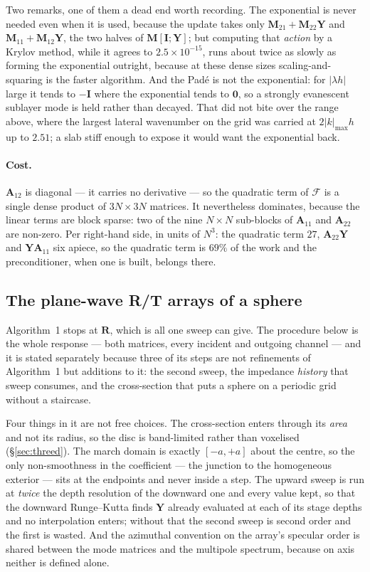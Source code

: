 \documentclass[11pt,a4paper]{article}
\newcommand{\bI}{\mathbf{I}}
\newcommand{\bA}{\mathbf{A}}
\newcommand{\bR}{\mathbf{R}}
\newcommand{\bY}{\mathbf{Y}}
\begin{document}
Two remarks, one of them a dead end worth recording.  The exponential is never
needed even when it is used, because the update takes only
$\mathbf{M}_{21}+\mathbf{M}_{22}\bY$ and $\mathbf{M}_{11}+\mathbf{M}_{12}\bY$,
the two halves of $\mathbf{M}[\bI;\bY]$; but computing that \emph{action} by a
Krylov method, while it agrees to $2.5\times10^{-15}$, runs about twice as
slowly as forming the exponential outright, because at these dense sizes
scaling-and-squaring is the faster algorithm.  And the Pad\'e is not the
exponential: for $|\lambda h|$ large it tends to $-\bI$ where the exponential
tends to $\mathbf{0}$, so a strongly evanescent sublayer mode is held rather
than decayed.  That did not bite over the range above, where the largest lateral
wavenumber on the grid was carried at $2|k|_{\max}h$ up to $2.51$; a slab stiff
enough to expose it would want the exponential back.

\paragraph{Cost.}  $\bA_{12}$ is diagonal --- it carries no derivative --- so
the quadratic term of $\mathcal{F}$ is a single dense product of
$3N\times3N$ matrices.  It nevertheless dominates, because the linear terms are
block sparse: two of the nine $N\times N$ sub-blocks of $\bA_{11}$ and
$\bA_{22}$ are non-zero.  Per right-hand side, in units of $N^3$: the quadratic
term $27$, $\bA_{22}\bY$ and $\bY\bA_{11}$ six apiece, so the quadratic term is
$69\%$ of the work and the preconditioner, when one is built, belongs there.

\subsection{The plane-wave R/T arrays of a
sphere}\label{sec:algorithm-rt}

Algorithm~1 stops at $\bR$, which is all one sweep can give.  The procedure
below is the whole response --- both matrices, every incident and outgoing
channel --- and it is stated separately because three of its steps are not
refinements of Algorithm~1 but additions to it: the second sweep, the impedance
\emph{history} that sweep consumes, and the cross-section that puts a sphere on
a periodic grid without a staircase.

Four things in it are not free choices.  The cross-section enters through its
\emph{area} and not its radius, so the disc is band-limited rather than
voxelised (\S\ref{sec:threed}).  The march domain is exactly $[-a,+a]$ about the
centre, so the only non-smoothness in the coefficient --- the junction to the
homogeneous exterior --- sits at the endpoints and never inside a step.  The
upward sweep is run at \emph{twice} the depth resolution of the downward one and
every value kept, so that the downward Runge--Kutta finds $\bY$ already
evaluated at each of its stage depths and no interpolation enters; without that
the second sweep is second order and the first is wasted.  And the azimuthal
convention on the array's specular order is shared between the mode matrices and
the multipole spectrum, because on axis neither is defined alone.
\end{document}
